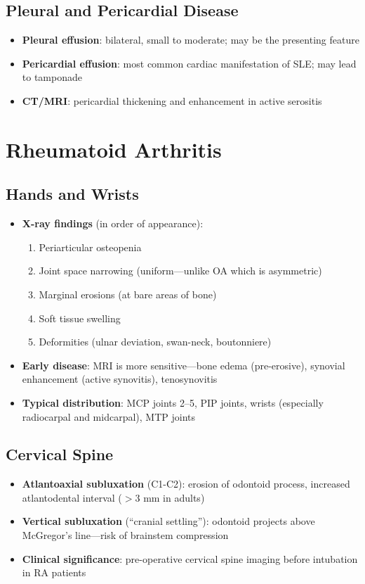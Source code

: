 \subsection{Pleural and Pericardial Disease}
\begin{itemize}
  \item \textbf{Pleural effusion}: bilateral, small to moderate; may be the presenting feature
  \item \textbf{Pericardial effusion}: most common cardiac manifestation of SLE; may lead to tamponade
  \item \textbf{CT/MRI}: pericardial thickening and enhancement in active serositis
\end{itemize}

\section{Rheumatoid Arthritis}

\subsection{Hands and Wrists}
\begin{itemize}
  \item \textbf{X-ray findings} (in order of appearance):
    \begin{enumerate}
      \item Periarticular osteopenia
      \item Joint space narrowing (uniform---unlike OA which is asymmetric)
      \item Marginal erosions (at bare areas of bone)
      \item Soft tissue swelling
      \item Deformities (ulnar deviation, swan-neck, boutonniere)
    \end{enumerate}
  \item \textbf{Early disease}: MRI is more sensitive---bone edema (pre-erosive), synovial enhancement (active synovitis), tenosynovitis
  \item \textbf{Typical distribution}: MCP joints 2--5, PIP joints, wrists (especially radiocarpal and midcarpal), MTP joints
\end{itemize}

\subsection{Cervical Spine}
\begin{itemize}
  \item \textbf{Atlantoaxial subluxation} (C1-C2): erosion of odontoid process, increased atlantodental interval ($>$3 mm in adults)
  \item \textbf{Vertical subluxation} (``cranial settling''): odontoid projects above McGregor's line---risk of brainstem compression
  \item \textbf{Clinical significance}: pre-operative cervical spine imaging before intubation in RA patients
\end{itemize}

